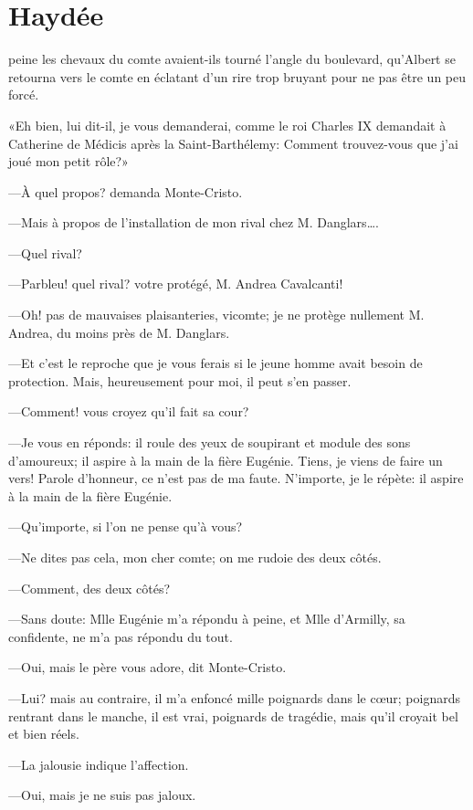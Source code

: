 \chapter{Haydée} 

\lettrine{}{} peine les chevaux du comte avaient-ils tourné l'angle du boulevard, qu'Albert se retourna vers le comte en éclatant d'un rire trop bruyant pour ne pas être un peu forcé. 

\zz
«Eh bien, lui dit-il, je vous demanderai, comme le roi Charles IX demandait à Catherine de Médicis après la Saint-Barthélemy: Comment trouvez-vous que j'ai joué mon petit rôle?» 

—À quel propos? demanda Monte-Cristo. 

—Mais à propos de l'installation de mon rival chez M. Danglars\dots. 

—Quel rival? 

—Parbleu! quel rival? votre protégé, M. Andrea Cavalcanti! 

—Oh! pas de mauvaises plaisanteries, vicomte; je ne protège nullement M. Andrea, du moins près de M. Danglars. 

—Et c'est le reproche que je vous ferais si le jeune homme avait besoin de protection. Mais, heureusement pour moi, il peut s'en passer. 

—Comment! vous croyez qu'il fait sa cour? 

—Je vous en réponds: il roule des yeux de soupirant et module des sons d'amoureux; il aspire à la main de la fière Eugénie. Tiens, je viens de faire un vers! Parole d'honneur, ce n'est pas de ma faute. N'importe, je le répète: il aspire à la main de la fière Eugénie. 

—Qu'importe, si l'on ne pense qu'à vous? 

—Ne dites pas cela, mon cher comte; on me rudoie des deux côtés. 

—Comment, des deux côtés? 

—Sans doute: Mlle Eugénie m'a répondu à peine, et Mlle d'Armilly, sa confidente, ne m'a pas répondu du tout. 

—Oui, mais le père vous adore, dit Monte-Cristo. 

—Lui? mais au contraire, il m'a enfoncé mille poignards dans le cœur; poignards rentrant dans le manche, il est vrai, poignards de tragédie, mais qu'il croyait bel et bien réels. 

—La jalousie indique l'affection. 

—Oui, mais je ne suis pas jaloux. 

